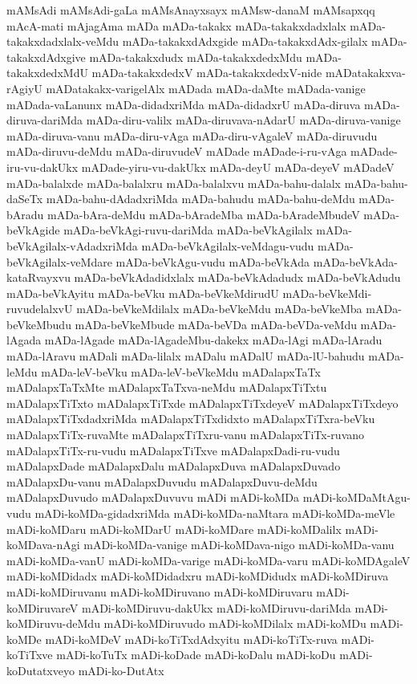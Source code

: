 {mAMsAdi
mAMsAdi-gaLa
mAMsAnayxsayx
mAMsw-danaM
mAMsapxqq
mAcA-mati
mAjagAma
mADa
mADa-takakx
mADa-takakxdadxlalx
mADa-takakxdadxlalx-veMdu
mADa-takakxdAdxgide
mADa-takakxdAdx-gilalx
mADa-takakxdAdxgive
mADa-takakxdudx
mADa-takakxdedxMdu
mADa-takakxdedxMdU
mADa-takakxdedxV
mADa-takakxdedxV-nide
mADatakakxva-rAgiyU
mADatakakx-varigelAlx
mADada
mADa-daMte
mADada-vanige
mADada-vaLanunx
mADa-didadxriMda
mADa-didadxrU
mADa-diruva
mADa-diruva-dariMda
mADa-diru-valilx
mADa-diruvava-nAdarU
mADa-diruva-vanige
mADa-diruva-vanu
mADa-diru-vAga
mADa-diru-vAgaleV
mADa-diruvudu
mADa-diruvu-deMdu
mADa-diruvudeV
mADade
mADade-i-ru-vAga
mADade-iru-vu-dakUkx
mADade-yiru-vu-dakUkx
mADa-deyU
mADa-deyeV
mADadeV
mADa-balalxde
mADa-balalxru
mADa-balalxvu
mADa-bahu-dalalx
mADa-bahu-daSeTx
mADa-bahu-dAdadxriMda
mADa-bahudu
mADa-bahu-deMdu
mADa-bAradu
mADa-bAra-deMdu
mADa-bAradeMba
mADa-bAradeMbudeV
mADa-beVkAgide
mADa-beVkAgi-ruvu-dariMda
mADa-beVkAgilalx
mADa-beVkAgilalx-vAdadxriMda
mADa-beVkAgilalx-veMdagu-vudu
mADa-beVkAgilalx-veMdare
mADa-beVkAgu-vudu
mADa-beVkAda
mADa-beVkAda-kataRvayxvu
mADa-beVkAdadidxlalx
mADa-beVkAdadudx
mADa-beVkAdudu
mADa-beVkAyitu
mADa-beVku
mADa-beVkeMdirudU
mADa-beVkeMdi-ruvudelalxvU
mADa-beVkeMdilalx
mADa-beVkeMdu
mADa-beVkeMba
mADa-beVkeMbudu
mADa-beVkeMbude
mADa-beVDa
mADa-beVDa-veMdu
mADa-lAgada
mADa-lAgade
mADa-lAgadeMbu-dakekx
mADa-lAgi
mADa-lAradu
mADa-lAravu
mADali
mADa-lilalx
mADalu
mADalU
mADa-lU-bahudu
mADa-leMdu
mADa-leV-beVku
mADa-leV-beVkeMdu
mADalapxTaTx
mADalapxTaTxMte
mADalapxTaTxva-neMdu
mADalapxTiTxtu
mADalapxTiTxto
mADalapxTiTxde
mADalapxTiTxdeyeV
mADalapxTiTxdeyo
mADalapxTiTxdadxriMda
mADalapxTiTxdidxto
mADalapxTiTxra-beVku
mADalapxTiTx-ruvaMte
mADalapxTiTxru-vanu
mADalapxTiTx-ruvano
mADalapxTiTx-ru-vudu
mADalapxTiTxve
mADalapxDadi-ru-vudu
mADalapxDade
mADalapxDalu
mADalapxDuva
mADalapxDuvado
mADalapxDu-vanu
mADalapxDuvudu
mADalapxDuvu-deMdu
mADalapxDuvudo
mADalapxDuvuvu
mADi
mADi-koMDa
mADi-koMDaMtAgu-vudu
mADi-koMDa-gidadxriMda
mADi-koMDa-naMtara
mADi-koMDa-meVle
mADi-koMDaru
mADi-koMDarU
mADi-koMDare
mADi-koMDalilx
mADi-koMDava-nAgi
mADi-koMDa-vanige
mADi-koMDava-nigo
mADi-koMDa-vanu
mADi-koMDa-vanU
mADi-koMDa-varige
mADi-koMDa-varu
mADi-koMDAgaleV
mADi-koMDidadx
mADi-koMDidadxru
mADi-koMDidudx
mADi-koMDiruva
mADi-koMDiruvanu
mADi-koMDiruvano
mADi-koMDiruvaru
mADi-koMDiruvareV
mADi-koMDiruvu-dakUkx
mADi-koMDiruvu-dariMda
mADi-koMDiruvu-deMdu
mADi-koMDiruvudo
mADi-koMDilalx
mADi-koMDu
mADi-koMDe
mADi-koMDeV
mADi-koTiTxdAdxyitu
mADi-koTiTx-ruva
mADi-koTiTxve
mADi-koTuTx
mADi-koDade
mADi-koDalu
mADi-koDu
mADi-koDutatxveyo
mADi-ko-DutAtx
}
